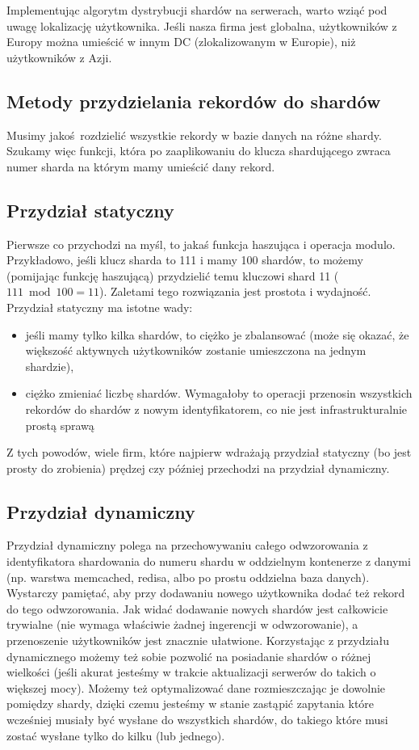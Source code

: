 \documentclass[a4paper,12pt]{article}
\begin{document}
Implementując algorytm dystrybucji shardów na serwerach, warto wziąć pod uwagę lokalizację użytkownika. Jeśli nasza firma jest globalna, użytkowników z Europy można umieścić w innym DC (zlokalizowanym w Europie), niż użytkowników z Azji.

\subsection{Metody przydzielania rekordów do shardów}

Musimy jakoś rozdzielić wszystkie rekordy w bazie danych na różne shardy. Szukamy więc funkcji, która po zaaplikowaniu do klucza shardującego zwraca numer sharda na którym mamy umieścić dany rekord.

\subsection{Przydział statyczny}

Pierwsze co przychodzi na myśl, to jakaś funkcja haszująca i operacja modulo. Przykładowo, jeśli klucz sharda to 111 i mamy 100 shardów, to możemy (pomijając funkcję haszującą) przydzielić temu kluczowi shard 11 ($111 \bmod 100 = 11$). Zaletami tego rozwiązania jest prostota i wydajność. Przydział statyczny ma istotne wady:

\begin{itemize}
 \setlength{\itemsep}{0.06cm}
 \setlength{\parskip}{0.06cm}
 \item jeśli mamy tylko kilka shardów, to ciężko je zbalansować (może się okazać, że większość aktywnych użytkowników zostanie umieszczona na jednym shardzie),
 \item ciężko zmieniać liczbę shardów. Wymagałoby to operacji przenosin wszystkich rekordów do shardów z nowym identyfikatorem, co nie jest infrastrukturalnie prostą sprawą
\end{itemize}

Z tych powodów, wiele firm, które najpierw wdrażają przydział statyczny (bo jest prosty do zrobienia) prędzej czy później przechodzi na przydział dynamiczny.

\subsection{Przydział dynamiczny}

Przydział dynamiczny polega na przechowywaniu całego odwzorowania z identyfikatora shardowania do numeru shardu w oddzielnym kontenerze z danymi (np. warstwa memcached, redisa, albo po prostu oddzielna baza danych). Wystarczy pamiętać, aby przy dodawaniu nowego użytkownika dodać też rekord do tego odwzorowania. Jak widać dodawanie nowych shardów jest całkowicie trywialne (nie wymaga właściwie żadnej ingerencji w odwzorowanie), a przenoszenie użytkowników jest znacznie ułatwione. Korzystając z przydziału dynamicznego możemy też sobie pozwolić na posiadanie shardów o różnej wielkości (jeśli akurat jesteśmy w trakcie aktualizacji serwerów do takich o większej mocy). Możemy też optymalizować dane rozmieszczając je dowolnie pomiędzy shardy, dzięki czemu jesteśmy w stanie zastąpić zapytania które wcześniej musiały być wysłane do wszystkich shardów, do takiego które musi zostać wysłane tylko do kilku (lub jednego).
\end{document}
